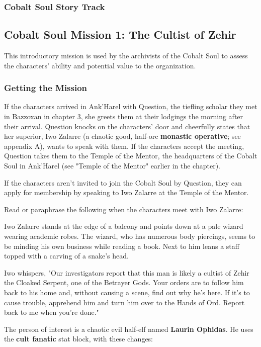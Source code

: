 \documentclass[10pt,a4paper,twoside,bg=print,twocolumn,openany,nodeprecatedcode]{dndbook}
\begin{document}
\subsubsection{Cobalt Soul Story Track}
\subsection{Cobalt Soul Mission 1: The Cultist of Zehir}
This introductory mission is used by the archivists of the Cobalt Soul to assess the characters' ability and potential value to the organization.

\subsubsection{Getting the Mission}
If the characters arrived in Ank'Harel with Question, the tiefling scholar they met in Bazzoxan in chapter 3, she greets them at their lodgings the morning after their arrival. Question knocks on the characters' door and cheerfully states that her superior, Iwo Zalarre (a chaotic good, half-orc \textbf{monastic operative}; see appendix A), wants to speak with them. If the characters accept the meeting, Question takes them to the Temple of the Mentor, the headquarters of the Cobalt Soul in Ank'Harel (see "Temple of the Mentor" earlier in the chapter).

If the characters aren't invited to join the Cobalt Soul by Question, they can apply for membership by speaking to Iwo Zalarre at the Temple of the Mentor.

Read or paraphrase the following when the characters meet with Iwo Zalarre:

\begin{DndReadAloud}{}
Iwo Zalarre stands at the edge of a balcony and points down at a pale wizard wearing academic robes. The wizard, who has numerous body piercings, seems to be minding his own business while reading a book. Next to him leans a staff topped with a carving of a snake's head.

Iwo whispers, "Our investigators report that this man is likely a cultist of Zehir the Cloaked Serpent, one of the Betrayer Gods. Your orders are to follow him back to his home and, without causing a scene, find out why he's here. If it's to cause trouble, apprehend him and turn him over to the Hands of Ord. Report back to me when you're done."

\end{DndReadAloud}

The person of interest is a chaotic evil half-elf named \textbf{Laurin Ophidas}. He uses the \textbf{cult fanatic} stat block, with these changes:
\end{document}
